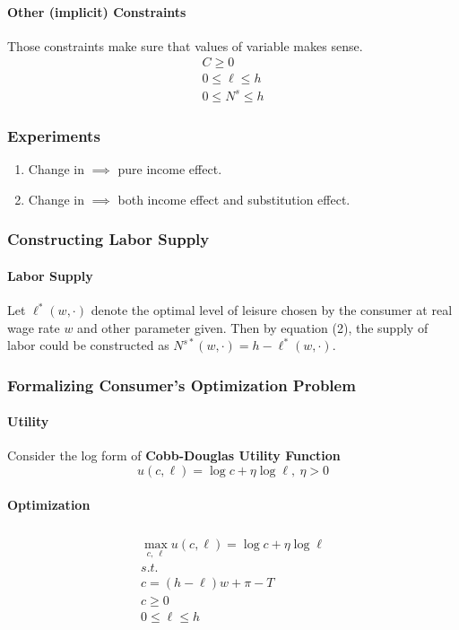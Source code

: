 \documentclass[11pt]{article}
\begin{document}
\paragraph{Other (implicit) Constraints} Those constraints make sure that values of variable makes sense.
\begin{align}
	C \geq 0 \\
	0 \leq \ell \leq h \\
	0 \leq N^s \leq h
\end{align}

\subsubsection{Experiments}
\begin{enumerate}
	\item Change in  $\implies$ pure income effect.
	\item Change in  $\implies$ both income effect and substitution effect.
\end{enumerate}

\subsubsection{Constructing Labor Supply}
\paragraph{Labor Supply} Let $\ell^*(w, \cdot)$ denote the optimal level of leisure chosen by the consumer at real wage rate $w$ and other parameter given. Then by equation (2), the supply of labor could be constructed as $N^{s*}(w,\cdot) = h - \ell^*(w, \cdot)$.
\subsubsection{Formalizing Consumer's Optimization Problem}
\paragraph{Utility} Consider the log form of \textbf{Cobb-Douglas Utility Function}
\[
	u(c,\ell) = \log{c} + \eta \log{\ell},\ \eta > 0
\]
\paragraph{Optimization}
\begin{multline}
\\
	\max_{c,\ \ell} u(c,\ell) = \log{c} + \eta \log{\ell} \\
	s.t. \\
	c = (h-\ell)w+\pi-T \\
	c \geq 0 \\
	0 \leq \ell \leq h \\
\end{multline}
\end{document}
